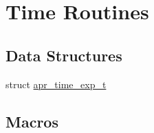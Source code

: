 \hypertarget{group__apr__time}{\section{Time Routines}
\label{group__apr__time}
}
\subsection*{Data Structures}
\begin{DoxyCompactItemize}
\item 
struct \hyperlink{structapr__time__exp__t}{apr\-\_\-time\-\_\-exp\-\_\-t}
\end{DoxyCompactItemize}
\subsection*{Macros}
